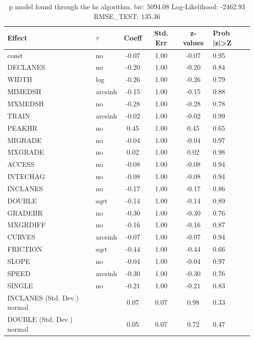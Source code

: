 \begin{table}
	\caption{p model found through the hs algorithm. bic: 5094.08 Log-Likelihood: -2462.93 RMSE_TEST: 135.36}
	\begin{center}
		\begin{tabular}{|l|l|c|c|c|l|}
			\hline
			Effect & $\tau$ & Coeff & Std. Err & z-values & Prob |z|>Z \\
			\hline
			const & no & -0.07 & 1.00 & -0.07 & 0.95 \\
			\hline
			DECLANES & no & -0.20 & 1.00 & -0.20 & 0.84 \\
			\hline
			WIDTH & log & -0.26 & 1.00 & -0.26 & 0.79 \\
			\hline
			MIMEDSH & arcsinh & -0.15 & 1.00 & -0.15 & 0.88 \\
			\hline
			MXMEDSH & no & -0.28 & 1.00 & -0.28 & 0.78 \\
			\hline
			TRAIN & arcsinh & -0.02 & 1.00 & -0.02 & 0.99 \\
			\hline
			PEAKHR & no & 0.45 & 1.00 & 0.45 & 0.65 \\
			\hline
			MIGRADE & no & -0.04 & 1.00 & -0.04 & 0.97 \\
			\hline
			MXGRADE & no & 0.02 & 1.00 & 0.02 & 0.98 \\
			\hline
			ACCESS & no & -0.08 & 1.00 & -0.08 & 0.94 \\
			\hline
			INTECHAG & no & -0.08 & 1.00 & -0.08 & 0.94 \\
			\hline
			INCLANES & no & -0.17 & 1.00 & -0.17 & 0.86 \\
			\hline
			DOUBLE & sqrt & -0.14 & 1.00 & -0.14 & 0.89 \\
			\hline
			GRADEBR & no & -0.30 & 1.00 & -0.30 & 0.76 \\
			\hline
			MXGRDIFF & no & -0.16 & 1.00 & -0.16 & 0.87 \\
			\hline
			CURVES & arcsinh & -0.07 & 1.00 & -0.07 & 0.94 \\
			\hline
			FRICTION & sqrt & -0.44 & 1.00 & -0.44 & 0.66 \\
			\hline
			SLOPE & no & -0.04 & 1.00 & -0.04 & 0.97 \\
			\hline
			SPEED & arcsinh & -0.30 & 1.00 & -0.30 & 0.76 \\
			\hline
			SINGLE & no & -0.21 & 1.00 & -0.21 & 0.83 \\
			\hline
			INCLANES (Std. Dev.) normal &  & 0.07 & 0.07 & 0.98 & 0.33 \\
			\hline
			DOUBLE (Std. Dev.) normal &  & 0.05 & 0.07 & 0.72 & 0.47 \\

\end{tabular}
\end{center}
\end{table}
